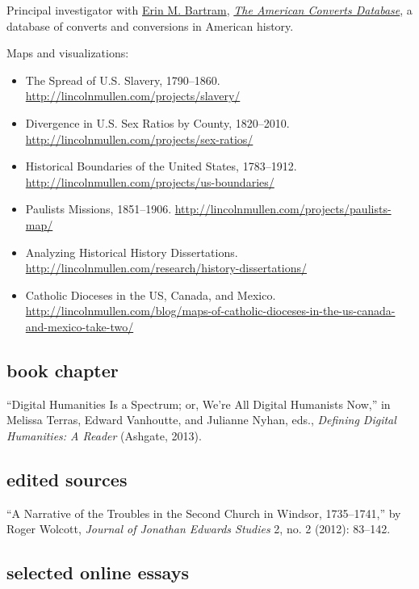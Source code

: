 \documentclass[11pt]{article}
\begin{document}
Principal investigator with
\href{http://history.uconn.edu/doctoral-students/erin-m-bartram/}{Erin
  M. Bartram}, \emph{\href{http://americanconverts.org}{The American
    Converts Database}}, a database of converts and conversions in American
history.

Maps and visualizations:

\begin{itemize}
  \item The Spread of U.S.  Slavery, 1790--1860. 
    \url{http://lincolnmullen.com/projects/slavery/}
  \item Divergence in U.S. Sex Ratios by County, 1820--2010. 
    \url{http://lincolnmullen.com/projects/sex-ratios/}
  \item Historical Boundaries of the United States, 1783--1912.
    \url{http://lincolnmullen.com/projects/us-boundaries/}
  \item Paulists Missions, 1851--1906. 
    \url{http://lincolnmullen.com/projects/paulists-map/}
  \item Analyzing Historical History Dissertations. 
    \url{http://lincolnmullen.com/research/history-dissertations/}
  \item Catholic Dioceses in the US, Canada, and Mexico. 
    \url{http://lincolnmullen.com/blog/maps-of-catholic-dioceses-in-the-us-canada-and-mexico-take-two/}
\end{itemize}

\subsection{book chapter}\label{book-chapter}

``Digital Humanities Is a Spectrum; or, We're All Digital Humanists
Now,'' in Melissa Terras, Edward Vanhoutte, and Julianne Nyhan, eds.,
\emph{Defining Digital Humanities: A Reader} (Ashgate, 2013).

\subsection{edited sources}\label{edited-sources}

``A Narrative of the Troubles in the Second Church in Windsor,
1735--1741,'' by Roger Wolcott, \emph{Journal of Jonathan Edwards
  Studies} 2, no. 2 (2012): 83--142.

\subsection{selected online essays}\label{selected-online-essays}
\end{document}
